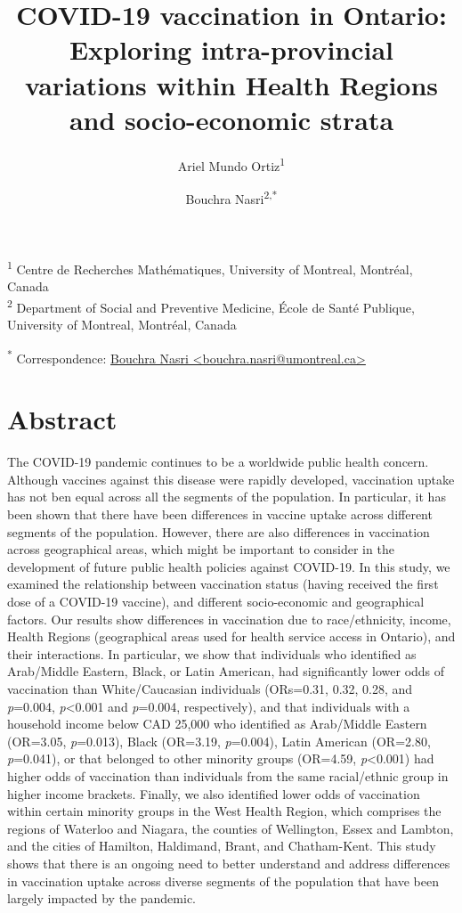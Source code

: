 \documentclass[
  letterpaper,
  DIV=11,
  numbers=noendperiod]{scrartcl}
\title{\textbf{COVID-19 vaccination in Ontario: Exploring
intra-provincial variations within Health Regions and socio-economic
strata}}
\author{Ariel Mundo Ortiz\textsuperscript{1} \and Bouchra
Nasri\textsuperscript{2,*}}
\date{}
\begin{document}
\maketitle
\ifdefined\Shaded\renewenvironment{Shaded}{\begin{tcolorbox}[frame hidden, borderline west={3pt}{0pt}{shadecolor}, breakable, enhanced, interior hidden, sharp corners, boxrule=0pt]}{\end{tcolorbox}}\fi

\textsuperscript{1} Centre de Recherches Mathématiques, University of
Montreal, Montréal, Canada\\
\textsuperscript{2} Department of Social and Preventive Medicine, École
de Santé Publique, University of Montreal, Montréal, Canada

\textsuperscript{*} Correspondence:
\href{mailto:bouchra.nasri@umontreal.ca}{Bouchra Nasri
\textless{}bouchra.nasri@umontreal.ca\textgreater{}}

\hypertarget{abstract}{%
\section{Abstract}\label{abstract}}

The COVID-19 pandemic continues to be a worldwide public health concern.
Although vaccines against this disease were rapidly developed,
vaccination uptake has not ben equal across all the segments of the
population. In particular, it has been shown that there have been
differences in vaccine uptake across different segments of the
population. However, there are also differences in vaccination across
geographical areas, which might be important to consider in the
development of future public health policies against COVID-19. In this
study, we examined the relationship between vaccination status (having
received the first dose of a COVID-19 vaccine), and different
socio-economic and geographical factors. Our results show differences in
vaccination due to race/ethnicity, income, Health Regions (geographical
areas used for health service access in Ontario), and their
interactions. In particular, we show that individuals who identified as
Arab/Middle Eastern, Black, or Latin American, had significantly lower
odds of vaccination than White/Caucasian individuals (ORs=0.31, 0.32,
0.28, and \emph{p}=0.004, \emph{p}\textless0.001 and \emph{p}=0.004,
respectively), and that individuals with a household income below CAD
25,000 who identified as Arab/Middle Eastern (OR=3.05, \emph{p}=0.013),
Black (OR=3.19, \emph{p}=0.004), Latin American (OR=2.80,
\emph{p}=0.041), or that belonged to other minority groups (OR=4.59,
\emph{p}\textless0.001) had higher odds of vaccination than individuals
from the same racial/ethnic group in higher income brackets. Finally, we
also identified lower odds of vaccination within certain minority groups
in the West Health Region, which comprises the regions of Waterloo and
Niagara, the counties of Wellington, Essex and Lambton, and the cities
of Hamilton, Haldimand, Brant, and Chatham-Kent. This study shows that
there is an ongoing need to better understand and address differences in
vaccination uptake across diverse segments of the population that have
been largely impacted by the pandemic.
\end{document}
